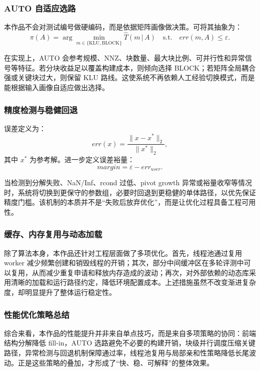 \documentclass[12pt,a4paper,fontset=none]{ctexart}
\begin{document}
\subsubsection{AUTO 自适应选路}

本作品不会对测试编号做硬编码，而是依据矩阵画像做决策。可将其抽象为：
\begin{equation}
\pi(A)=
\arg\min_{m\in\{\mathrm{KLU},\mathrm{BLOCK}\}}
\widehat{T}(m\,|\,A)
\quad \text{s.t.}\quad
err(m,A)\le \varepsilon.
\end{equation}

在实现上，AUTO 会参考规模、NNZ、块数量、最大块比例、可并行性和异常信号等特征。若分块收益足以覆盖构建成本，则倾向选择 BLOCK；若矩阵全局耦合强或关键块过大，则保留 KLU 路线。这使系统不再依赖人工经验切换模式，而是能根据输入画像自适应做出选择。

\subsubsection{精度检测与稳健回退}

误差定义为：
\begin{equation}
err(x)=\frac{\|x-x^\ast\|_2}{\|x^\ast\|_2},
\end{equation}
其中 $x^\ast$ 为参考解。进一步定义误差裕量：
\begin{equation}
margin=\varepsilon-err_{user}.
\end{equation}

当检测到分解失败、NaN/Inf、rcond 过低、pivot growth 异常或裕量收窄等情况时，系统将切换到更保守的参数组，必要时回退到更稳健的单体路径，以优先保证精度门槛。该机制的本质并不是“失败后放弃优化”，而是让优化过程具备工程可用性。

\subsubsection{缓存、内存复用与动态加载}

除了算法本身，本作品还针对工程层面做了多项优化。首先，线程池通过复用 worker 减少频繁创建和销毁线程的开销；其次，部分中间缓冲区在多轮评测中可以复用，从而减少重复申请和释放内存造成的波动；再次，对外部依赖的动态库采用清晰的加载和运行路径约定，降低环境配置成本。上述措施虽然不改变渐进复杂度，却明显提升了整体运行稳定性。

\subsubsection{性能优化策略总结}

综合来看，本作品的性能提升并非来自单点技巧，而是来自多项策略的协同：前端结构分解降低 fill-in，AUTO 选路避免不必要的构建开销，块级并行调度压缩关键路径，异常检测与回退机制保障通过率，线程池复用与局部亲和性策略降低长尾波动。正是这些策略的叠加，才形成了“快、稳、可解释”的整体效果。
\end{document}
